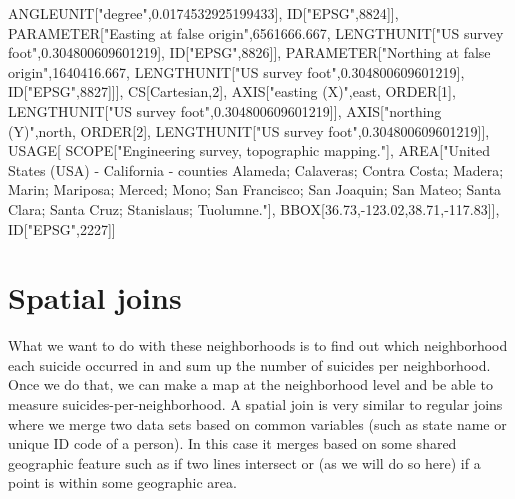 \documentclass[
  12pt,
  openany]{book}
\newenvironment{Shaded}{\begin{snugshade}}{\end{snugshade}}
\newcommand{\DecValTok}[1]{\textcolor[rgb]{0.06,0.06,0.06}{#1}}
\newcommand{\FloatTok}[1]{\textcolor[rgb]{0.06,0.06,0.06}{#1}}
\newcommand{\NormalTok}[1]{#1}
\newcommand{\SpecialCharTok}[1]{\textcolor[rgb]{0,0,0}{#1}}
\newcommand{\StringTok}[1]{\textcolor[rgb]{0.5,0.5,0.5}{#1}}
\begin{document}
\begin{Shaded}
\begin{Highlighting}[]
\NormalTok{            ANGLEUNIT[}\StringTok{"degree"}\NormalTok{,}\FloatTok{0.0174532925199433}\NormalTok{],}
\NormalTok{            ID[}\StringTok{"EPSG"}\NormalTok{,}\DecValTok{8824}\NormalTok{]],}
\NormalTok{        PARAMETER[}\StringTok{"Easting at false origin"}\NormalTok{,}\FloatTok{6561666.667}\NormalTok{,}
\NormalTok{            LENGTHUNIT[}\StringTok{"US survey foot"}\NormalTok{,}\FloatTok{0.304800609601219}\NormalTok{],}
\NormalTok{            ID[}\StringTok{"EPSG"}\NormalTok{,}\DecValTok{8826}\NormalTok{]],}
\NormalTok{        PARAMETER[}\StringTok{"Northing at false origin"}\NormalTok{,}\FloatTok{1640416.667}\NormalTok{,}
\NormalTok{            LENGTHUNIT[}\StringTok{"US survey foot"}\NormalTok{,}\FloatTok{0.304800609601219}\NormalTok{],}
\NormalTok{            ID[}\StringTok{"EPSG"}\NormalTok{,}\DecValTok{8827}\NormalTok{]]],}
\NormalTok{    CS[Cartesian,}\DecValTok{2}\NormalTok{],}
\NormalTok{        AXIS[}\StringTok{"easting (X)"}\NormalTok{,east,}
\NormalTok{            ORDER[}\DecValTok{1}\NormalTok{],}
\NormalTok{            LENGTHUNIT[}\StringTok{"US survey foot"}\NormalTok{,}\FloatTok{0.304800609601219}\NormalTok{]],}
\NormalTok{        AXIS[}\StringTok{"northing (Y)"}\NormalTok{,north,}
\NormalTok{            ORDER[}\DecValTok{2}\NormalTok{],}
\NormalTok{            LENGTHUNIT[}\StringTok{"US survey foot"}\NormalTok{,}\FloatTok{0.304800609601219}\NormalTok{]],}
\NormalTok{    USAGE[}
\NormalTok{        SCOPE[}\StringTok{"Engineering survey, topographic mapping."}\NormalTok{],}
\NormalTok{        AREA[}\StringTok{"United States (USA) {-} California {-} counties Alameda; Calaveras; Contra Costa; Madera; Marin; Mariposa; Merced; Mono; San Francisco; San Joaquin; San Mateo; Santa Clara; Santa Cruz; Stanislaus; Tuolumne."}\NormalTok{],}
\NormalTok{        BBOX[}\FloatTok{36.73}\NormalTok{,}\SpecialCharTok{{-}}\FloatTok{123.02}\NormalTok{,}\FloatTok{38.71}\NormalTok{,}\SpecialCharTok{{-}}\FloatTok{117.83}\NormalTok{]],}
\NormalTok{    ID[}\StringTok{"EPSG"}\NormalTok{,}\DecValTok{2227}\NormalTok{]]}
\end{Highlighting}
\end{Shaded}

\hypertarget{spatial-joins}{%
\section{Spatial joins}\label{spatial-joins}}

What we want to do with these neighborhoods is to find out which neighborhood each suicide occurred in and sum up the number of suicides per neighborhood. Once we do that, we can make a map at the neighborhood level and be able to measure suicides-per-neighborhood. A spatial join is very similar to regular joins where we merge two data sets based on common variables (such as state name or unique ID code of a person). In this case it merges based on some shared geographic feature such as if two lines intersect or (as we will do so here) if a point is within some geographic area.
\end{document}

